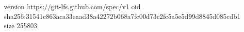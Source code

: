 version https://git-lfs.github.com/spec/v1
oid sha256:31541c863aca33eaad38a42272b068a7fc00d73c2fc5a5e5d99d8845d085cdb1
size 255803
